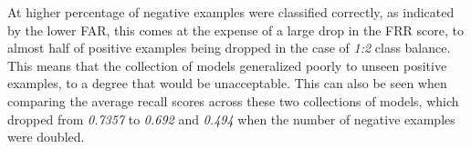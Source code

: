 At higher percentage of negative examples were classified correctly, as indicated by the lower FAR, this comes at the expense of a large drop in the FRR score, to almost half of positive examples being dropped in the case of \textit{1:2} class balance. This means that the collection of models generalized poorly to unseen positive examples, to a degree that would be unacceptable. This can also be seen when comparing the average recall scores across these two collections of models, which dropped from \textit{0.7357} to \textit{0.692} and \textit{0.494} when the number of negative examples were doubled. 
